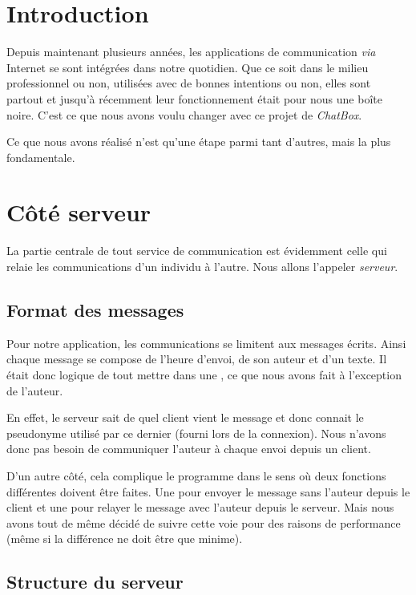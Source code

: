 \section{Introduction}

Depuis maintenant plusieurs années, les applications de
communication \emph{via} Internet se sont intégrées dans notre
quotidien. Que ce soit dans le milieu professionnel ou non,
utilisées avec de bonnes intentions ou non, elles sont
partout et jusqu'à récemment leur fonctionnement était pour
nous une boîte noire. C'est ce que nous avons voulu changer
avec ce projet de \emph{ChatBox}.

Ce que nous avons réalisé n'est qu'une étape parmi tant d'autres,
mais la plus fondamentale.

\section{Côté serveur}

La partie centrale de tout service de communication est
évidemment celle qui relaie les communications d'un individu
à l'autre. Nous allons l'appeler \emph{serveur}.

\subsection{Format des messages}

Pour notre application, les communications se limitent aux
messages écrits. Ainsi chaque message se compose de l'heure
d'envoi, de son auteur et d'un texte.
Il était donc logique de tout mettre dans une
\verb@struct@, ce que nous avons fait à l'exception
de l'auteur.

En effet, le serveur sait de quel client vient le message et
donc connait le pseudonyme utilisé par ce dernier (fourni
lors de la connexion). Nous n'avons donc pas besoin de
communiquer l'auteur à chaque envoi depuis un client.

D'un autre côté, cela complique le programme dans le sens où
deux fonctions différentes doivent être faites. Une pour
envoyer le message sans l'auteur depuis le client et une
pour relayer le message avec l'auteur depuis le serveur.
Mais nous avons tout de même décidé de suivre cette voie
pour des raisons de performance (même si la différence
ne doit être que minime).

\subsection{Structure du serveur}

